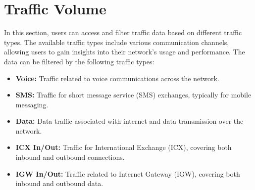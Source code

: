 \section{Traffic Volume}

In this section, users can access and filter traffic data based on different traffic types. The available traffic types include various communication channels, allowing users to gain insights into their network's usage and performance. The data can be filtered by the following traffic types:

\begin{itemize}
  \item \textbf{Voice:} Traffic related to voice communications across the network.
  \item \textbf{SMS:} Traffic for short message service (SMS) exchanges, typically for mobile messaging.
  \item \textbf{Data:} Data traffic associated with internet and data transmission over the network.
  \item \textbf{ICX In/Out:} Traffic for International Exchange (ICX), covering both inbound and outbound connections.
  \item \textbf{IGW In/Out:} Traffic related to Internet Gateway (IGW), covering both inbound and outbound data.
\end{itemize}



